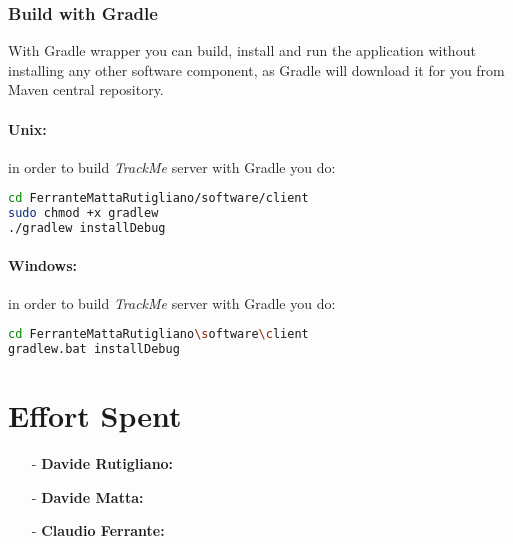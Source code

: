 \documentclass[a4paper]{article}
\begin{document}
\subsubsection{Build with Gradle}
With Gradle wrapper you can build, install and run the application without installing any other software component, as Gradle will download it for you from Maven central repository.

\paragraph{Unix:} in order to build \textit{TrackMe} server with Gradle you do:

\begin{lstlisting}[language=bash]
cd FerranteMattaRutigliano/software/client
sudo chmod +x gradlew
./gradlew installDebug
\end{lstlisting}

\paragraph{Windows:} in order to build \textit{TrackMe} server with Gradle you do:

\begin{lstlisting}[language=bash]
cd FerranteMattaRutigliano\software\client
gradlew.bat installDebug
\end{lstlisting}

\newpage
\section{Effort Spent}
    \begin{itemize}
        \item[-] \textbf{Davide Rutigliano: }
        
        \item[-] \textbf{Davide Matta: }
        
        \item[-] \textbf{Claudio Ferrante: }
    \end{itemize}
\end{document}
